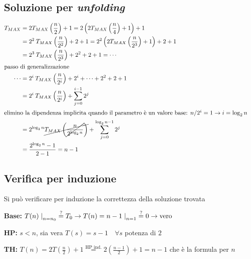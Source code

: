 \subsection{Soluzione per \textit{unfolding}}
\begin{align*}
        T_{MAX} &=
        2 T_{MAX} \left( \frac{n}{2} \right) + 1
        = 2 \left( 2 T_{MAX} \left( \frac{n}{4} \right) + 1 \right) + 1 \\
        &= 2^2 \:T_{MAX} \left( \frac{n}{2^2} \right) +2 +1
        = 2^2 \left( 2 T_{MAX} \left( \frac{n}{2^3} \right) + 1 \right) +2+1 \\
        &= 2^3 \:T_{MAX} \left( \frac{n}{2^3} \right) +2^2 +2 +1 = \cdots \\ 
        \intertext{passo di generalizzazione}
        \cdots &=2^i \:T_{MAX} \left( \frac{n}{2^i} \right) +2^i + \cdots +2^2 +2 +1 \\
        &= 2^i \:T_{MAX} \left( \frac{n}{2^i} \right) + \sum_{j=0}^{i-1} 2^j \\
        \intertext{elimino la dipendenza implicita quando il parametro è un valore base: $n / 2^i=1 \rightarrow i=\log_2 n$}
        &= 2^{\log_2 n} \cancel{ T_{MAX} \left( \cancel{\frac{n}{2^{\log_2 n}} } \right) } 
        + \sum_{j=0}^{\log_2 n-1} 2^j \\
        &= \frac{2^{\log_2 n}-1}{2-1} = n-1
\end{align*}

\subsection{Verifica per induzione}
Si può verificare per induzione la correttezza della soluzione trovata 

\begin{description}
    \item{\textbf{Base:}} $T(n)\left. \right|_{n=n_0} \overset{?}{=} T_0 \rightarrow 
            T(n)=n-1 \left. \right|_{n=1} \overset{?}{=} 0 \rightarrow \text{vero}$
    \item{\textbf{HP:}} $s < n$, sia vera $T(s) = s-1 \quad \forall s $ potenza di $2$
    \item{\textbf{TH:}} $T(n) = 2T \left( \frac{n}{2} \right) +1 \overset{\text{HP ind.}}{=} 
            2 \left( \frac{n-1}{2} \right)+1 = n-1$ che è la formula per $n$
\end{description}

